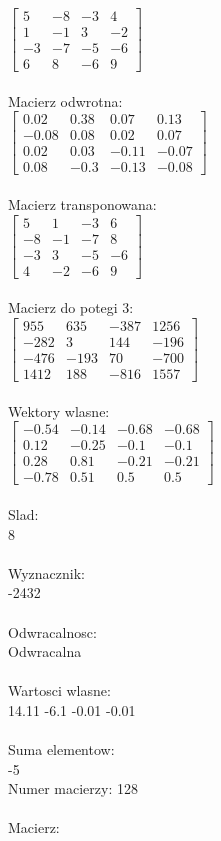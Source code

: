 \documentclass[a4paper,12pt]{article}
\begin{document}
$\begin{bmatrix} 5&-8&-3&4\\1&-1&3&-2\\-3&-7&-5&-6\\6&8&-6&9 \end{bmatrix}$
\\
\\
Macierz odwrotna:\\

$\begin{bmatrix} 0.02&0.38&0.07&0.13\\-0.08&0.08&0.02&0.07\\0.02&0.03&-0.11&-0.07\\0.08&-0.3&-0.13&-0.08 \end{bmatrix}$
\\
\\
Macierz transponowana:\\

$\begin{bmatrix} 5&1&-3&6\\-8&-1&-7&8\\-3&3&-5&-6\\4&-2&-6&9 \end{bmatrix}$
\\
\\
Macierz do potegi 3:\\

$\begin{bmatrix} 955&635&-387&1256\\-282&3&144&-196\\-476&-193&70&-700\\1412&188&-816&1557 \end{bmatrix}$
\\
\\
Wektory wlasne:\\

$\begin{bmatrix} -0.54&-0.14&-0.68&-0.68\\0.12&-0.25&-0.1&-0.1\\0.28&0.81&-0.21&-0.21\\-0.78&0.51&0.5&0.5 \end{bmatrix}$
\\
\\
Slad:\\
8
\\
\\
Wyznacznik:\\
-2432
\\
\\
Odwracalnosc:\\
Odwracalna
\\
\\
Wartosci wlasne:\\
14.11 -6.1 -0.01 -0.01
\\
\\
Suma elementow:\\
-5
\\
\newpage
Numer macierzy:
128
\\
\\
Macierz:\\
\end{document}
